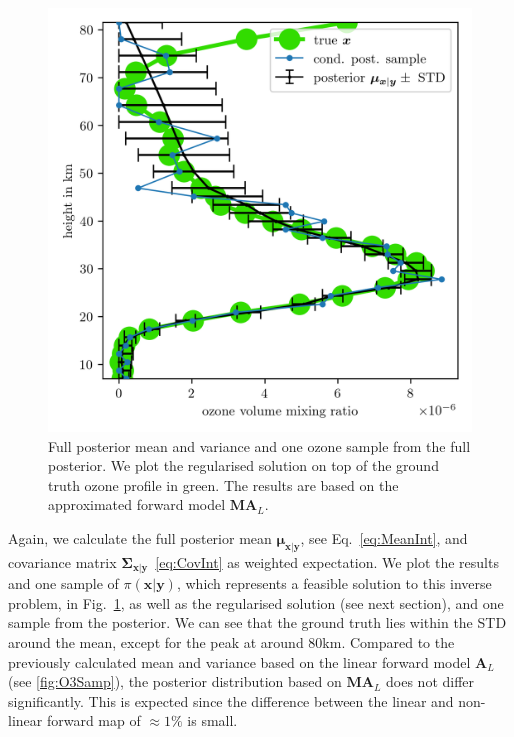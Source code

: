 \begin{figure}[ht!]
	\centering
	\includegraphics{SecRecResinclRegandSampl.png}
	\caption[Full posterior mean and variance of ozone and the regularised solution compared to the ground truth.]{Full posterior mean and variance and one ozone sample from the full posterior. We plot the regularised solution on top of the ground truth ozone profile in green. The results are based on the approximated forward model $\bm{M}\bm{A}_L$.}
	\label{fig:O3SolplsReg}
\end{figure} 
Again, we calculate the full posterior mean $\bm{\mu}_{\bm{x}|\bm{y}}$, see Eq.~\ref{eq:MeanInt}, and covariance matrix $\bm{\Sigma}_{ \bm{x}|\bm{y}}$~\ref{eq:CovInt} as weighted expectation.
We plot the results and one sample of $\pi(\bm{x}|\bm{y})$, which represents a feasible solution to this inverse problem, in Fig.~\ref{fig:O3SolplsReg}, as well as the regularised solution (see next section), and one sample from the posterior.
We can see that the ground truth lies within the STD around the mean, except for the peak at around $80$km.
Compared to the previously calculated mean and variance based on the linear forward model $\bm{A}_L$ (see \ref{fig:O3Samp}), the posterior distribution based on $\bm{M A}_L$ does not differ significantly.
This is expected since the difference between the linear and non-linear forward map of $\approx 1 \%$ is small.


